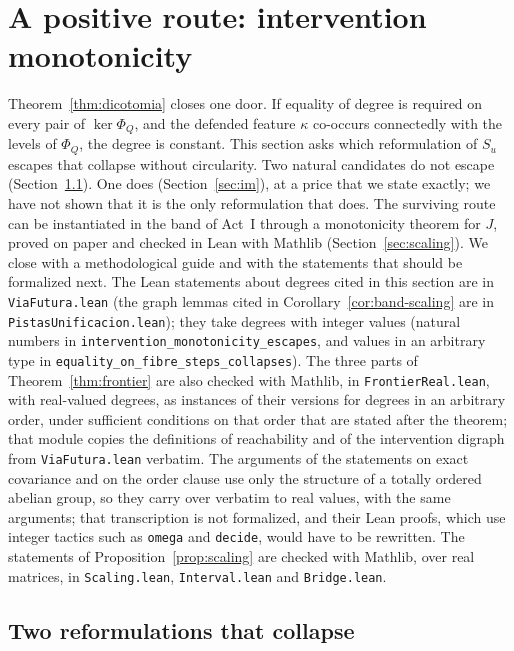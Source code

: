 \section{A positive route: intervention monotonicity}\label{sec:via-futura}
Theorem~\ref{thm:dicotomia} closes one door. If equality of degree is required on every pair of $\ker\Phi_Q$, and the defended feature $\kappa$ co-occurs connectedly with the levels of $\Phi_Q$, the degree is constant. This section asks which reformulation of $S_u$ escapes that collapse without circularity. Two natural candidates do not escape (Section~\ref{sec:collapse}). One does (Section~\ref{sec:im}), at a price that we state exactly; we have not shown that it is the only reformulation that does. The surviving route can be instantiated in the band of Act~I through a monotonicity theorem for $J$, proved on paper and checked in Lean with Mathlib (Section~\ref{sec:scaling}). We close with a methodological guide and with the statements that should be formalized next. The Lean statements about degrees cited in this section are in \texttt{ViaFutura.lean} (the graph lemmas cited in Corollary~\ref{cor:band-scaling} are in \texttt{PistasUnificacion.lean}); they take degrees with integer values (natural numbers in \texttt{intervention\_monotonicity\_escapes}, and values in an arbitrary type in \texttt{equality\_on\_fibre\_steps\_collapses}). The three parts of Theorem~\ref{thm:frontier} are also checked with Mathlib, in \texttt{FrontierReal.lean}, with real-valued degrees, as instances of their versions for degrees in an arbitrary order, under sufficient conditions on that order that are stated after the theorem; that module copies the definitions of reachability and of the intervention digraph from \texttt{ViaFutura.lean} verbatim. The arguments of the statements on exact covariance and on the order clause use only the structure of a totally ordered abelian group, so they carry over verbatim to real values, with the same arguments; that transcription is not formalized, and their Lean proofs, which use integer tactics such as \texttt{omega} and \texttt{decide}, would have to be rewritten. The statements of Proposition~\ref{prop:scaling} are checked with Mathlib, over real matrices, in \texttt{Scaling.lean}, \texttt{Interval.lean} and \texttt{Bridge.lean}.

\subsection{Two reformulations that collapse}\label{sec:collapse}
